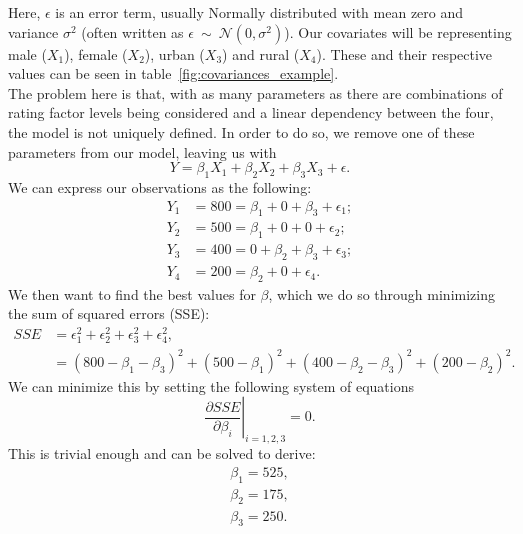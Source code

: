 \documentclass{article}
\begin{document}
Here, $\epsilon$ is an error term, usually Normally distributed with mean zero and variance $\sigma^2$ (often written as $\epsilon~\sim~\mathcal{N}(0,\sigma^2)$). Our covariates will be representing male ($X_1$), female ($X_2$), urban ($X_3$) and rural ($X_4$). These and their respective values can be seen in table~\ref{fig:covariances_example}.\\
The problem here is that, with as many parameters as there are combinations of rating factor levels being considered and a linear dependency between the four, the model is not uniquely defined. In order to do so, we remove one of these parameters from our model, leaving us with
\begin{equation}
    Y = \beta_1X_1 + \beta_2X_2 + \beta_3X_3  + \epsilon. \label{eq:linear_model_1}
\end{equation}
We can express our observations as the following:
\begin{align}
    Y_1 &= 800 = \beta_1 + 0 + \beta_3 + \epsilon_1;\\
    Y_2 &= 500 = \beta_1 + 0 + 0 + \epsilon_2;\\
    Y_3 &= 400 = 0 + \beta_2 + \beta_3 + \epsilon_3;\\
    Y_4 &= 200 = \beta_2 + 0 + \epsilon_4.
\end{align}
We then want to find the best values for $\beta$, which we do so through minimizing the sum of squared errors (SSE):
\begin{align}
    SSE &= \epsilon_1^2 + \epsilon_2^2 + \epsilon_3^2 + \epsilon_4^2, \\
    &= (800-\beta_1-\beta_3)^2 + (500-\beta_1)^2 + (400-\beta_2 - \beta_3)^2 + (200-\beta_2)^2.
\end{align}
We can minimize this by setting the following system of equations
\begin{equation}
    \left.\frac{\partial SSE}{\partial \beta_i}\right\vert_{i=1,2,3} = 0.
\end{equation}
This is trivial enough and can be solved to derive:
\begin{align}
    \beta_1 = 525,\\ \label{eq:simp1}
    \beta_2 = 175,\\
    \beta_3 = 250.\label{eq:simp3}
\end{align}
\end{document}
